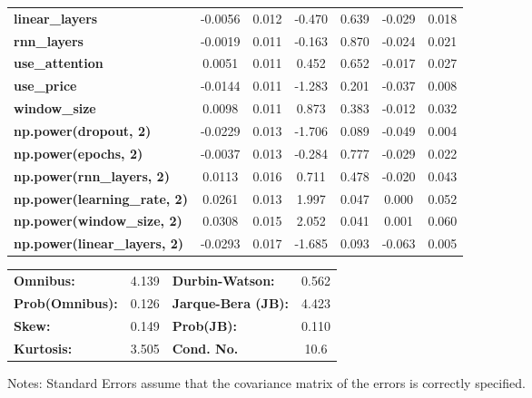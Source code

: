 \begin{center}
\begin{tabular}{lcccccc}
\textbf{linear\_layers}              &      -0.0056  &        0.012     &    -0.470  &         0.639        &       -0.029    &        0.018     \\
\textbf{rnn\_layers}                 &      -0.0019  &        0.011     &    -0.163  &         0.870        &       -0.024    &        0.021     \\
\textbf{use\_attention}              &       0.0051  &        0.011     &     0.452  &         0.652        &       -0.017    &        0.027     \\
\textbf{use\_price}                  &      -0.0144  &        0.011     &    -1.283  &         0.201        &       -0.037    &        0.008     \\
\textbf{window\_size}                &       0.0098  &        0.011     &     0.873  &         0.383        &       -0.012    &        0.032     \\
\textbf{np.power(dropout, 2)}        &      -0.0229  &        0.013     &    -1.706  &         0.089        &       -0.049    &        0.004     \\
\textbf{np.power(epochs, 2)}         &      -0.0037  &        0.013     &    -0.284  &         0.777        &       -0.029    &        0.022     \\
\textbf{np.power(rnn\_layers, 2)}    &       0.0113  &        0.016     &     0.711  &         0.478        &       -0.020    &        0.043     \\
\textbf{np.power(learning\_rate, 2)} &       0.0261  &        0.013     &     1.997  &         0.047        &        0.000    &        0.052     \\
\textbf{np.power(window\_size, 2)}   &       0.0308  &        0.015     &     2.052  &         0.041        &        0.001    &        0.060     \\
\textbf{np.power(linear\_layers, 2)} &      -0.0293  &        0.017     &    -1.685  &         0.093        &       -0.063    &        0.005     \\
\bottomrule
\end{tabular}
\begin{tabular}{lclc}
\textbf{Omnibus:}       &  4.139 & \textbf{  Durbin-Watson:     } &    0.562  \\
\textbf{Prob(Omnibus):} &  0.126 & \textbf{  Jarque-Bera (JB):  } &    4.423  \\
\textbf{Skew:}          &  0.149 & \textbf{  Prob(JB):          } &    0.110  \\
\textbf{Kurtosis:}      &  3.505 & \textbf{  Cond. No.          } &     10.6  \\
\bottomrule
\end{tabular}
\end{center}

Notes: \newline
 [1] Standard Errors assume that the covariance matrix of the errors is correctly specified.